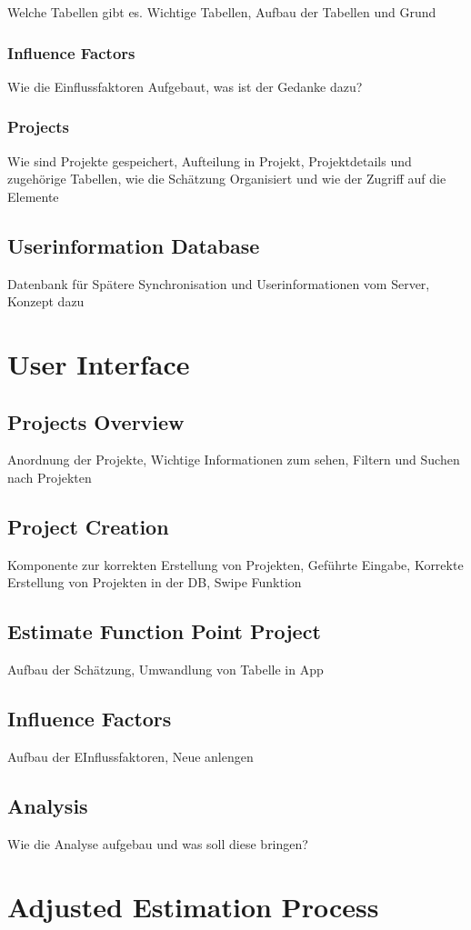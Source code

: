 Welche Tabellen gibt es. Wichtige Tabellen, Aufbau der Tabellen und Grund

\subsubsection{Influence Factors}

Wie die Einflussfaktoren Aufgebaut, was ist der Gedanke dazu?

\subsubsection{Projects}

Wie sind Projekte gespeichert, Aufteilung in Projekt, Projektdetails und zugehörige Tabellen, wie die Schätzung Organisiert und wie der Zugriff auf die Elemente

\subsection{Userinformation Database}

Datenbank für Spätere Synchronisation und Userinformationen vom Server, Konzept dazu

\section{User Interface}

\subsection{Projects Overview}

Anordnung der Projekte, Wichtige Informationen zum sehen, Filtern und Suchen nach Projekten

\subsection{Project Creation}

Komponente zur korrekten Erstellung von Projekten, Geführte Eingabe, Korrekte Erstellung von Projekten in der DB, Swipe Funktion

\subsection{Estimate Function Point Project}

Aufbau der Schätzung, Umwandlung von Tabelle in App

\subsection{Influence Factors}

Aufbau der EInflussfaktoren, Neue anlengen

\subsection{Analysis}

Wie die Analyse aufgebau und was soll diese bringen?

\section{Adjusted Estimation Process}



